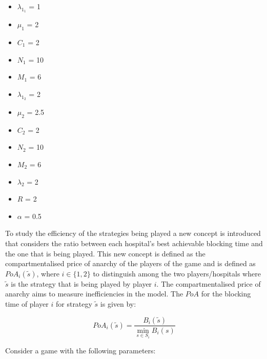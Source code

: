 \begin{multicols}{3}
    \begin{itemize}
        \item \( \lambda_{1_1} \) = 1
        \item \( \mu_1 \) = 2
        \item \( C_1 \) = 2
        \item \( N_1 \) = 10
        \item \( M_1 \) = 6

        \columnbreak
        \item \( \lambda_{1_2} \) = 2
        \item \( \mu_2 \) = 2.5
        \item \( C_2 \) = 2
        \item \( N_2 \) = 10
        \item \( M_2 \) = 6
        
        \columnbreak
        \item \( \lambda_2 \) = 2
        \item \( R \) = 2
        \item \( \alpha \) = 0.5
    \end{itemize}
\end{multicols}

To study the efficiency of the strategies being played a new concept is 
introduced that considers the ratio between each hospital's best achievable 
blocking time and the one that is being played.
This new concept is defined as the compartmentalised price of anarchy of the 
players of the game and is defined as \(PoA_i(\tilde{s})\), where 
\(i \in \{1, 2\}\) to distinguish among the two players/hospitals where 
\(\tilde{s}\) is the strategy that is being played by player \( i \). 
The compartmentalised price of anarchy aims to measure inefficiencies in the 
model.
The \(PoA\) for the blocking time of player \(i\) for strategy \(\tilde{s}\) 
is given by:

\begin{equation}\label{eq:poa_compartmentalised}
    PoA_{i}(\tilde{s}) = \frac{B_i(\tilde{s})}{\min_{s \in S_i} B_i(s)}
\end{equation}

Consider a game with the following parameters:

